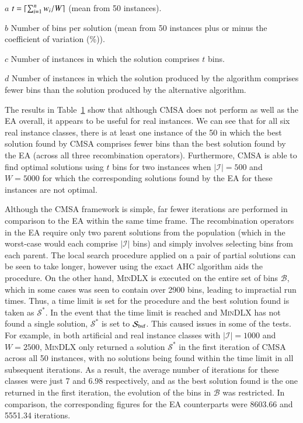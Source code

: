 \documentclass[authoryear]{elsarticle}
\begin{document}
\begin{table}[h!]
\begin{threeparttable}
\begin{tabular}{crrcrrrcrrr}
	\bottomrule
\end{tabular}
\vspace{0.2cm} %
\begin{tablenotes}
	\scriptsize
	\item[$a$] $t = \lceil\sum_{i=1}^{n} w_i / W\rceil$ (mean from 50 instances).
	\item[$b$] Number of bins per solution (mean from 50 instances plus or minus the coefficient of variation (\%)).
	\item[$c$] Number of instances in which the solution comprises $t$ bins.
	\item[$d$] Number of instances in which the solution produced by the algorithm comprises fewer bins than the solution produced by the alternative algorithm.
\end{tablenotes}	
\end{threeparttable}	
\label{table:cmsa}
\end{table}


\noindent The results in Table~\ref{table:cmsa} show that although CMSA does not perform as well as the EA overall, it appears to be useful for real instances. We can see that for all six real instance classes, there is at least one instance of the 50 in which the best solution found by CMSA comprises fewer bins than the best solution found by the EA (across all three recombination operators). Furthermore, CMSA is able to find optimal solutions using $t$ bins for two instances when $|\mathcal{I}| = 500$ and $W = 5000$ for which the corresponding solutions found by the EA for these instances are not optimal. 

Although the CMSA framework is simple, far fewer iterations are performed in comparison to the EA within the same time frame. The recombination operators in the EA require only two parent solutions from the population (which in the worst-case would each comprise $|\mathcal{I}|$ bins) and simply involves selecting bins from each parent. The local search procedure applied on a pair of partial solutions can be seen to take longer, however using the exact AHC algorithm aids the procedure. On the other hand, \textsc{MinDLX} is executed on the entire set of bins $\mathcal{B}$, which in some cases was seen to contain over 2900 bins, leading to impractial run times. Thus, a time limit is set for the procedure and the best solution found is taken as $\mathcal{S}^*$. In the event that the time limit is reached and \textsc{MinDLX} has not found a single solution, $\mathcal{S}^*$ is set to $\mathcal{S}_{\textup{bsf}}$. This caused issues in some of the tests. For example, in both artificial and real instance classes with $|\mathcal{I}| = 1000$ and $W =2500$, \textsc{MinDLX} only returned a solution $\mathcal{S}^*$ in the first iteration of CMSA across all 50 instances, with no solutions being found within the time limit in all subsequent iterations. As a result, the average number of iterations for these classes were just 7 and 6.98 respectively, and as the best solution found is the one returned in the first iteration, the evolution of the bins in $\mathcal{B}$ was restricted. In comparison, the corresponding figures for the EA counterparts were 8603.66 and 5551.34 iterations.
\end{document}
